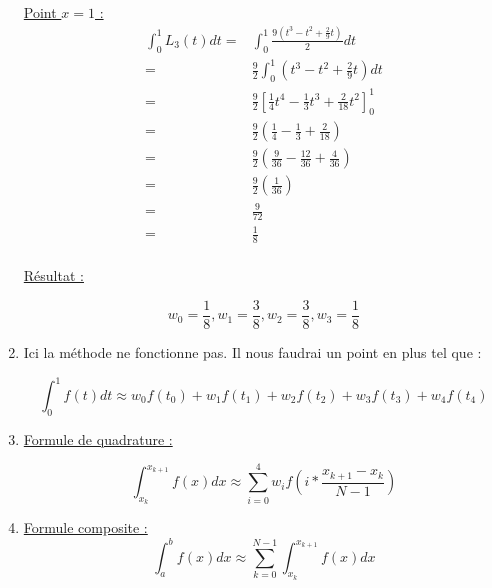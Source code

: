 \documentclass{article}
\begin{document}
\begin{enumerate}
\underline{Point $x = 1$ :}
\begin{equation*}
  \begin{split}
    \int_0^1 {L_3(t) dt} = & \int_0^1 {\frac{ 9 (t^3 - t^2 + \frac{2}{9} t)}
    {2} dt}
    \\
    = & \frac{9}{2} \int_0^1 { \left(t^3 - t^2 + \frac{2}{9} t \right) dt}
    \\
    = & \frac{9}{2} \left[ \frac{1}{4}t^4 - \frac{1}{3}t^3 +
      \frac{2}{18} t^2 \right]_0^1
    \\
    = & \frac{9}{2} \left(\frac{1}{4} - \frac{1}{3} +
      \frac{2}{18} \right)
    \\
    = & \frac{9}{2} \left( \frac{9}{36} - \frac{12}{36} +
      \frac{4}{36} \right)
    \\
    = & \frac{9}{2} \left( \frac{1}{36} \right)
    \\
    = & \frac{9}{72}
    \\
    = & \frac{1}{8}
    \\
  \end{split}
\end{equation*}

\underline{Résultat :}

\begin{equation*}
    w_0 = \frac{1}{8},
    w_1 = \frac{3}{8},
    w_2 = \frac{3}{8},
    w_3 = \frac{1}{8}
\end{equation*}

\item Ici la méthode ne fonctionne pas. \newline
  Il nous faudrai un point en plus tel que :

  \begin{equation*}
    \int_0^1 {f(t) dt} \approx w_0 f(t_0) + w_1 f(t_1) + w_2 f(t_2) +
    w_3 f(t_3) + w_4 f(t_4)
  \end{equation*}
  
\item \underline{Formule de quadrature :}

  \begin{equation*}
    \int_{x_k}^{x_{k+1}} {f(x) dx} \approx \sum_{i = 0}^4 {w_i f\left(
    i * \frac{x_{k + 1} - x_k}{N - 1} \right)}
  \end{equation*}


\item \underline{Formule composite :}
  \begin{equation*}
    \int_a^b {f(x) dx} \approx \sum_{k = 0}^{N - 1}{\int_{x_k}^{x_{k +
          1}}{f(x) dx}}
  \end{equation*}


\end{enumerate}
\end{document}
